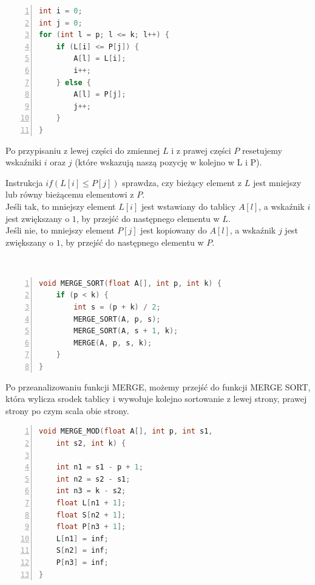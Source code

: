 \documentclass{article}
\begin{document}
\begin{lstlisting}[language=C++, caption={Fragment 2 funkcji sortującej przez scalenie bez modyfikacji}, numbers=left, frame=single, xleftmargin=20pt, xrightmargin = 1pt]
int i = 0;
int j = 0;
for (int l = p; l <= k; l++) {
	if (L[i] <= P[j]) {
		A[l] = L[i];
		i++;
	} else {
		A[l] = P[j];
		j++;
	}
}
\end{lstlisting}

\large{Po przypisaniu z lewej części do zmiennej \(L\) i z prawej części \(P\) resetujemy wskaźniki \(i\) oraz \(j\) (które wskazują naszą pozycję w kolejno w L i P).
	
Instrukcja \(if (L[i] \leq P[j])\) sprawdza, czy bieżący element z \(L\) jest mniejszy lub równy bieżącemu elementowi z \(P\). \\
Jeśli tak, to mniejszy element \(L[i]\) jest wstawiany do tablicy \(A[l]\), a wskaźnik \(i\) jest zwiększany o \(1\), by przejść do następnego elementu w \(L\). \\
Jeśli nie, to mniejszy element \(P[j]\) jest kopiowany do \(A[l]\), a wskaźnik \(j\) jest zwiększany o \(1\), by przejść do następnego elementu w \(P\).}
\\

\begin{lstlisting}[language=C++, caption={Fragment 3 funkcji sortującej przez scalenie bez modyfikacji}, numbers=left, frame=single, xleftmargin=20pt, xrightmargin = 1pt]
void MERGE_SORT(float A[], int p, int k) {
	if (p < k) {
		int s = (p + k) / 2;
		MERGE_SORT(A, p, s);
		MERGE_SORT(A, s + 1, k);
		MERGE(A, p, s, k);
	}
}
\end{lstlisting}

\large{Po przeanalizowaniu funkcji MERGE, możemy przejść do funkcji MERGE SORT, która wylicza srodek tablicy i wywołuje kolejno sortowanie z lewej strony, prawej strony po czym scala obie strony.}

\begin{lstlisting}[language=C++, caption={Fragment 1 funkcji sortującej przez scalenie z modyfikacją}, numbers=left, frame=single, xleftmargin=20pt, xrightmargin = 1pt]
void MERGE_MOD(float A[], int p, int s1, 
	int s2, int k) {
		
	int n1 = s1 - p + 1;
	int n2 = s2 - s1;
	int n3 = k - s2;
	float L[n1 + 1];
	float S[n2 + 1];
	float P[n3 + 1];
	L[n1] = inf;
	S[n2] = inf;
	P[n3] = inf;
}
\end{lstlisting}
\end{document}
